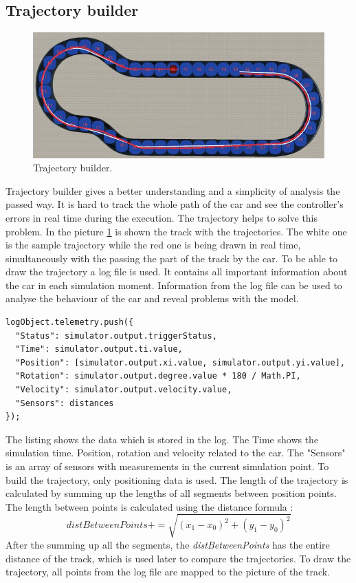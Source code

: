 \subsection{Trajectory builder}
\begin{figure}[h!]
    \centering
    \includegraphics[width=0.8\linewidth]{src/pic/trajectory}
    \caption{Trajectory builder.}
    \label{fig:trajectory}
\end{figure}
Trajectory builder gives a better understanding and a simplicity of analysis the passed way. It is hard to track the whole path of the car and see the controller's errors in real time during the execution. The trajectory helps to solve this problem. In the picture \ref{fig:trajectory} is shown the track with the trajectories. The white one is the sample trajectory while the red one is being drawn in real time, simultaneously with the passing the part of the track by the car. To be able to draw the trajectory a log file is used. It contains all important information about the car in each simulation moment. Information from the log file can be used to analyse the behaviour of the car and reveal problems with the model.
\bigskip
\begin{lstlisting}
logObject.telemetry.push({
  "Status": simulator.output.triggerStatus,
  "Time": simulator.output.ti.value,
  "Position": [simulator.output.xi.value, simulator.output.yi.value],
  "Rotation": simulator.output.degree.value * 180 / Math.PI,
  "Velocity": simulator.output.velocity.value,
  "Sensors": distances
});
\end{lstlisting}
\bigskip
The listing shows the data which is stored in the log. The Time shows the simulation time. Position, rotation and velocity related to the car. The "Sensors" is an array of sensors with measurements in the current simulation point. To build the trajectory, only positioning data is used. The length of the trajectory is calculated by summing up the lengths of all segments between position points. The length between points is calculated using the distance formula \cite{Distance}:
\begin{equation}
    distBetweenPoints += \sqrt{(x_1-x_0)^2 + (y_1-y_0)^2}
\end{equation}
After the summing up all the segments, the \textit{distBetweenPoints} has the entire distance of the track, which is used later to compare the trajectories. To draw the trajectory, all points from the log file are mapped to the picture of the track.
